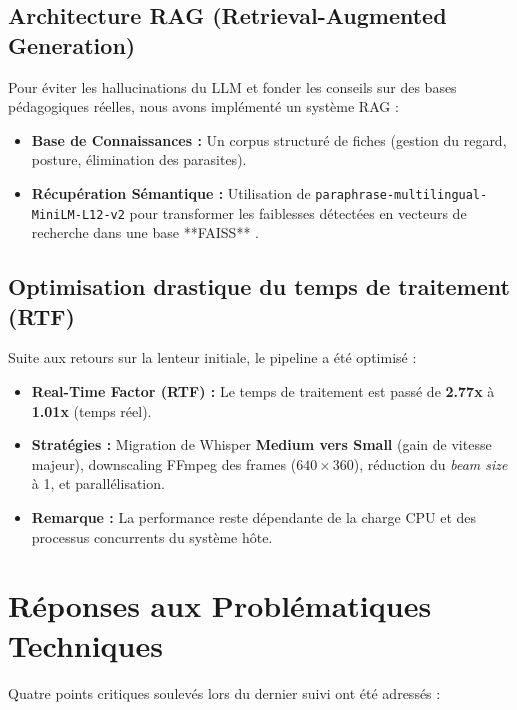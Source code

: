 \documentclass[12pt,a4paper]{article}
\begin{document}
\subsection{Architecture RAG (Retrieval-Augmented Generation)}
Pour éviter les hallucinations du LLM et fonder les conseils sur des bases pédagogiques réelles, nous avons implémenté un système RAG :
\begin{itemize}
    \item \textbf{Base de Connaissances :} Un corpus structuré de fiches (gestion du regard, posture, élimination des parasites).
    \item \textbf{Récupération Sémantique :} Utilisation de \texttt{paraphrase-multilingual-MiniLM-L12-v2} \cite{reimers-2019-sentence-bert} pour transformer les faiblesses détectées en vecteurs de recherche dans une base **FAISS** \cite{johnson2019billion}. 
\end{itemize}

\subsection{Optimisation drastique du temps de traitement (RTF)}
Suite aux retours sur la lenteur initiale, le pipeline a été optimisé :
\begin{itemize}
    \item \textbf{Real-Time Factor (RTF) :} Le temps de traitement est passé de \textbf{2.77x} à \textbf{1.01x} (temps réel).
    \item \textbf{Stratégies :} Migration de Whisper \textbf{Medium vers Small} (gain de vitesse majeur), downscaling FFmpeg des frames ($640\times360$), réduction du \textit{beam size} à 1, et parallélisation.
    \item \textbf{Remarque :} La performance reste dépendante de la charge CPU et des processus concurrents du système hôte.
\end{itemize}

\section{Réponses aux Problématiques Techniques}
Quatre points critiques soulevés lors du dernier suivi ont été adressés :
\end{document}

